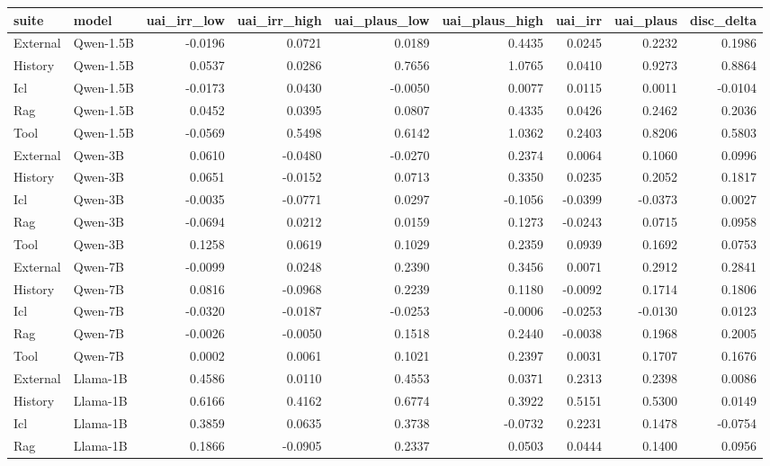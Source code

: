 \begin{tabular}{llrrrrrrr}
\toprule
suite & model & uai_irr_low & uai_irr_high & uai_plaus_low & uai_plaus_high & uai_irr & uai_plaus & disc_delta \\
\midrule
External & Qwen-1.5B & -0.0196 & 0.0721 & 0.0189 & 0.4435 & 0.0245 & 0.2232 & 0.1986 \\
History & Qwen-1.5B & 0.0537 & 0.0286 & 0.7656 & 1.0765 & 0.0410 & 0.9273 & 0.8864 \\
Icl & Qwen-1.5B & -0.0173 & 0.0430 & -0.0050 & 0.0077 & 0.0115 & 0.0011 & -0.0104 \\
Rag & Qwen-1.5B & 0.0452 & 0.0395 & 0.0807 & 0.4335 & 0.0426 & 0.2462 & 0.2036 \\
Tool & Qwen-1.5B & -0.0569 & 0.5498 & 0.6142 & 1.0362 & 0.2403 & 0.8206 & 0.5803 \\
External & Qwen-3B & 0.0610 & -0.0480 & -0.0270 & 0.2374 & 0.0064 & 0.1060 & 0.0996 \\
History & Qwen-3B & 0.0651 & -0.0152 & 0.0713 & 0.3350 & 0.0235 & 0.2052 & 0.1817 \\
Icl & Qwen-3B & -0.0035 & -0.0771 & 0.0297 & -0.1056 & -0.0399 & -0.0373 & 0.0027 \\
Rag & Qwen-3B & -0.0694 & 0.0212 & 0.0159 & 0.1273 & -0.0243 & 0.0715 & 0.0958 \\
Tool & Qwen-3B & 0.1258 & 0.0619 & 0.1029 & 0.2359 & 0.0939 & 0.1692 & 0.0753 \\
External & Qwen-7B & -0.0099 & 0.0248 & 0.2390 & 0.3456 & 0.0071 & 0.2912 & 0.2841 \\
History & Qwen-7B & 0.0816 & -0.0968 & 0.2239 & 0.1180 & -0.0092 & 0.1714 & 0.1806 \\
Icl & Qwen-7B & -0.0320 & -0.0187 & -0.0253 & -0.0006 & -0.0253 & -0.0130 & 0.0123 \\
Rag & Qwen-7B & -0.0026 & -0.0050 & 0.1518 & 0.2440 & -0.0038 & 0.1968 & 0.2005 \\
Tool & Qwen-7B & 0.0002 & 0.0061 & 0.1021 & 0.2397 & 0.0031 & 0.1707 & 0.1676 \\
External & Llama-1B & 0.4586 & 0.0110 & 0.4553 & 0.0371 & 0.2313 & 0.2398 & 0.0086 \\
History & Llama-1B & 0.6166 & 0.4162 & 0.6774 & 0.3922 & 0.5151 & 0.5300 & 0.0149 \\
Icl & Llama-1B & 0.3859 & 0.0635 & 0.3738 & -0.0732 & 0.2231 & 0.1478 & -0.0754 \\
Rag & Llama-1B & 0.1866 & -0.0905 & 0.2337 & 0.0503 & 0.0444 & 0.1400 & 0.0956 \\

\end{tabular}

